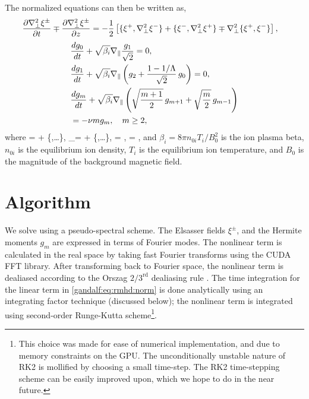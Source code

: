 The normalized equations can then be written as, 
\begin{align}
    \frac{\partial \nabla_\perp^2 \xi^\pm}{\partial t} \mp \frac{\partial \nabla_\perp^2 \xi^\pm}{\partial z} & = - \frac{1}{2} \left[
    \{\xi^+, \nabla_\perp^2 \xi^- \} + \{\xi^-, \nabla_\perp^2 \xi^+ \} \mp \nabla_\perp^2
    \{\xi^+, \xi^-
    \} \right], \label{gandalf:eq:rmhd:norm}
\end{align}
\begin{align}
    \label{gandalf:eq:g0:norm}
    &\frac{d g_0}{d t} + \sqrt{\beta_i} \nabla_\parallel\frac{g_1}{\sqrt{2}}  = 0,\\
    \label{gandalf:eq:g1:norm}
    &\frac{d g_1}{d t} + \sqrt{\beta_i} \nabla_\parallel\left(g_2 + \frac{1-1/\Lambda}{\sqrt{2}}\,g_0\right)
    = 0,\\
    &\frac{d g_m}{d t} + \sqrt{\beta_i} \nabla_\parallel\left(\sqrt{\frac{m+1}{2}}\,g_{m+1} +
    \sqrt{\frac{m}{2}}\,g_{m-1}\right) \nonumber \\
    &= -\nu m g_m,  \quad m\ge2,
    \label{gandalf:eq:gmeq:norm}
\end{align}
where
\beq
     =  + \lt\{\Phi,\ldots\rt\}, \quad \nabla_\parallel =
     + \lt\{\Psi,\ldots\rt\}, 
\eeq
\beq
    \Phi = , \quad \Psi = ,
\eeq
and $\beta_i = 8\pi n_{0i} T_i/B_0^2$ is the ion plasma beta, $n_{0i}$ is the equilibrium ion density,
$T_i$ is the equilibrium ion temperature, and $B_0$ is the magnitude of the background
magnetic field.

\section{Algorithm}
    
    We solve  using a pseudo-spectral scheme.
    The Elsasser fields $\xi^\pm$, and the Hermite moments $g_m$ are expressed in terms of
    Fourier modes. The nonlinear term is calculated in the real space by taking fast Fourier
    transforms using the CUDA FFT library. After transforming back
    to Fourier space, the nonlinear term is dealiased according to
    the Orszag $2/3^{\text{rd}}$ dealiasing rule \cite{orszag71}.
    The time
    integration for the linear term in \eqref{gandalf:eq:rmhd:norm} is done analytically using an
    integrating factor technique (discussed below); the nonlinear term is integrated using second-order
    Runge-Kutta scheme\footnote{This choice was made for ease of numerical implementation,
	and due to memory constraints on the GPU. 
    The unconditionally unstable nature of RK2
    is mollified by choosing a small time-step. The RK2 time-stepping scheme can be easily
	improved upon, which we hope to do in the near future.}.
    
